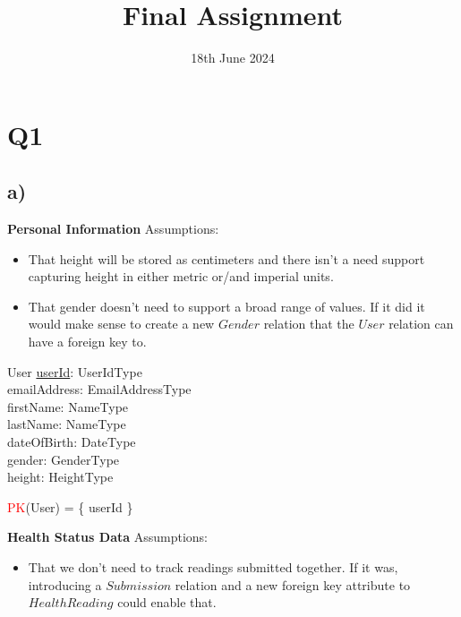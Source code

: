 \documentclass{article}
\title{Final Assignment}
\date{\vspace{-1.0cm}18th June 2024}
\begin{document}
\maketitle

\section*{Q1}

\subsection*{\small a)}

\textbf{Personal Information}
\newline \newline Assumptions:
\begin{itemize}
  \item That height will be stored as centimeters and there isn't a need support capturing height in either metric or/and imperial units.
  \item That gender doesn't need to support a broad range of values. If it did it would make sense to create a new $Gender$ relation that the $User$ relation can have a foreign key to. 
\end{itemize}
\begin{schema}{User}
	\underline{userId}: UserIdType \\
    emailAddress: EmailAddressType \\
	firstName: NameType \\
	lastName: NameType \\
    dateOfBirth: DateType \\
    gender: GenderType \\
    height: HeightType \\ 
\end{schema}
\begin{zed}
\textcolor{red}{PK}(User) = \{ userId \} \\
\end{zed}

\vspace{0.2cm}
\hspace{-0.5cm}\textbf{Health Status Data}
\newline \newline Assumptions:
\begin{itemize}
  \item That we don't need to track readings submitted together. If it was, introducing a $Submission$ relation and a new foreign key attribute to $HealthReading$ could enable that.
\end{itemize}
\end{document}
